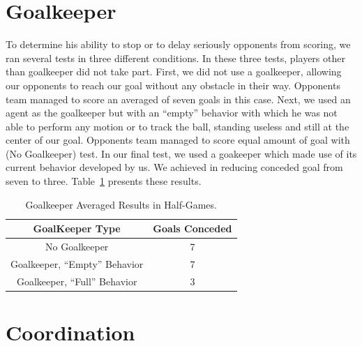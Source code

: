 \section{Goalkeeper}
To determine his ability to stop or to delay seriously opponents from scoring, we ran several tests in three different conditions. In these three tests, players other  than goalkeeper did not take part.
First, we did not use a goalkeeper, allowing our opponents to reach our goal without any obstacle in their way. Opponents team managed to score an averaged of seven goals in this case.
Next, we used an agent as the goalkeeper but with an ``empty'' behavior with which he was not able to perform any motion or to track the ball, standing useless and still at the center of our goal. Opponents team managed to score equal amount of goal with (No Goalkeeper) test.
In our final test, we used a goakeeper which made use of its current behavior developed by us. We achieved in reducing conceded goal from seven to three. Table~\ref{GoalKeeperResults} presents these results.



\begin{table}[t!]
\caption{Goalkeeper Averaged Results in Half-Games.}
\label{GoalKeeperResults}
\begin{center}
\begin{small}
    \begin{tabular}{cc}
    \textbf{GoalKeeper Type} 	& \textbf{Goals Conceded}\\
    \midrule
    No Goalkeeper						& 7\\
    Goalkeeper, ``Empty'' Behavior	& 7\\
    Goalkeeper, ``Full'' Behavior	& 3\\
    \end{tabular}
    \end{small}
\end{center}
\end{table}


\section{Coordination}

